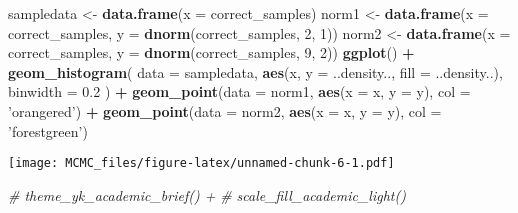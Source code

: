\documentclass[]{article}
\newenvironment{Shaded}{\begin{snugshade}}{\end{snugshade}}
\newcommand{\KeywordTok}[1]{\textcolor[rgb]{0.13,0.29,0.53}{\textbf{#1}}}
\newcommand{\DataTypeTok}[1]{\textcolor[rgb]{0.13,0.29,0.53}{#1}}
\newcommand{\DecValTok}[1]{\textcolor[rgb]{0.00,0.00,0.81}{#1}}
\newcommand{\FloatTok}[1]{\textcolor[rgb]{0.00,0.00,0.81}{#1}}
\newcommand{\StringTok}[1]{\textcolor[rgb]{0.31,0.60,0.02}{#1}}
\newcommand{\CommentTok}[1]{\textcolor[rgb]{0.56,0.35,0.01}{\textit{#1}}}
\newcommand{\OperatorTok}[1]{\textcolor[rgb]{0.81,0.36,0.00}{\textbf{#1}}}
\newcommand{\NormalTok}[1]{#1}
\begin{document}
\begin{Shaded}
\begin{Highlighting}[]
\NormalTok{sampledata <-}\StringTok{ }\KeywordTok{data.frame}\NormalTok{(}\DataTypeTok{x =}\NormalTok{ correct_samples)}
\NormalTok{norm1 <-}\StringTok{ }\KeywordTok{data.frame}\NormalTok{(}\DataTypeTok{x =}\NormalTok{ correct_samples, }\DataTypeTok{y =} \KeywordTok{dnorm}\NormalTok{(correct_samples, }\DecValTok{2}\NormalTok{, }\DecValTok{1}\NormalTok{))}
\NormalTok{norm2 <-}\StringTok{ }\KeywordTok{data.frame}\NormalTok{(}\DataTypeTok{x =}\NormalTok{ correct_samples, }\DataTypeTok{y =} \KeywordTok{dnorm}\NormalTok{(correct_samples, }\DecValTok{9}\NormalTok{, }\DecValTok{2}\NormalTok{))}
\KeywordTok{ggplot}\NormalTok{() }\OperatorTok{+}
\StringTok{  }\KeywordTok{geom_histogram}\NormalTok{(}
    \DataTypeTok{data =}\NormalTok{ sampledata, }
    \KeywordTok{aes}\NormalTok{(x, }\DataTypeTok{y =}\NormalTok{ ..density.., }\DataTypeTok{fill =}\NormalTok{ ..density..), }\DataTypeTok{binwidth =} \FloatTok{0.2}
\NormalTok{    ) }\OperatorTok{+}
\StringTok{  }\KeywordTok{geom_point}\NormalTok{(}\DataTypeTok{data =}\NormalTok{ norm1, }\KeywordTok{aes}\NormalTok{(}\DataTypeTok{x =}\NormalTok{ x, }\DataTypeTok{y =}\NormalTok{ y), }\DataTypeTok{col =} \StringTok{'orangered'}\NormalTok{) }\OperatorTok{+}
\StringTok{  }\KeywordTok{geom_point}\NormalTok{(}\DataTypeTok{data =}\NormalTok{ norm2, }\KeywordTok{aes}\NormalTok{(}\DataTypeTok{x =}\NormalTok{ x, }\DataTypeTok{y =}\NormalTok{ y), }\DataTypeTok{col =} \StringTok{'forestgreen'}\NormalTok{)}
\end{Highlighting}
\end{Shaded}

\texttt{[image: MCMC\_files/figure-latex/unnamed-chunk-6-1.pdf]}

\begin{Shaded}
\begin{Highlighting}[]
  \CommentTok{# theme_yk_academic_brief() +}
  \CommentTok{# scale_fill_academic_light()}
\end{Highlighting}
\end{Shaded}
\end{document}
